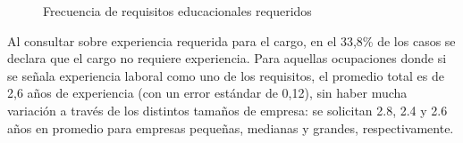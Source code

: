 \documentclass[
  11pt,
]{article}
\begin{document}
\begin{figure}[H]

\caption{\label{fig-educ-tot}Frecuencia de requisitos educacionales
requeridos}


\end{figure}%

Al consultar sobre experiencia requerida para el cargo, en el 33,8\% de
los casos se declara que el cargo no requiere experiencia. Para aquellas
ocupaciones donde si se señala experiencia laboral como uno de los
requisitos, el promedio total es de 2,6 años de experiencia (con un
error estándar de 0,12), sin haber mucha variación a través de los
distintos tamaños de empresa: se solicitan 2.8, 2.4 y 2.6 años en
promedio para empresas pequeñas, medianas y grandes, respectivamente.
\end{document}

